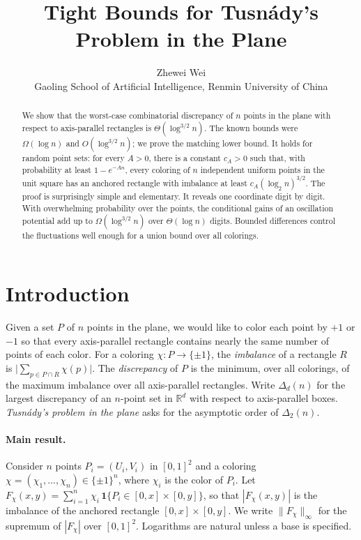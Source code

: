 \documentclass[11pt,letterpaper]{article}
\title{Tight Bounds for Tusn\'ady's Problem in the Plane}
\author{Zhewei Wei\\[2pt]
\normalsize Gaoling School of Artificial Intelligence, Renmin University of China}
\date{}
\newcommand{\R}{\mathbb{R}}
\newcommand{\1}{\mathbf{1}}
\newcommand{\Fnorm}[1]{\lVert #1\rVert_\infty}
\newcommand{\pmone}{\{\pm1\}}
\begin{document}
\hypersetup{pageanchor=false}
\maketitle

\begin{abstract}
We show that the worst-case combinatorial discrepancy of $n$ points in the plane with respect to axis-parallel rectangles is $\Theta(\log^{3/2}n)$. The known bounds were $\Omega(\log n)$ and $O(\log^{3/2}n)$; we prove the matching lower bound. It holds for random point sets: for every $A>0$, there is a constant $c_A>0$ such that, with probability at least $1-e^{-An}$, every coloring of $n$ independent uniform points in the unit square has an anchored rectangle with imbalance at least $c_A(\log_2n)^{3/2}$. The proof is surprisingly simple and elementary. It reveals one coordinate digit by digit. With overwhelming probability over the points, the conditional gains of an oscillation potential add up to $\Omega(\log^{3/2}n)$ over $\Theta(\log n)$ digits. Bounded differences control the fluctuations well enough for a union bound over all colorings.
\end{abstract}
\thispagestyle{empty}
\newpage
\setcounter{page}{1}
\hypersetup{pageanchor=true}

\section{Introduction}\label{sec:intro}

Given a set $P$ of $n$ points in the plane, we would like to color each point by $+1$ or $-1$ so that every axis-parallel rectangle contains nearly the same number of points of each color. For a coloring $\chi:P\to\pmone$, the \emph{imbalance} of a rectangle $R$ is $\bigl|\sum_{p\in P\cap R}\chi(p)\bigr|$. The \emph{discrepancy} of $P$ is the minimum, over all colorings, of the maximum imbalance over all axis-parallel rectangles. Write $\Delta_d(n)$ for the largest discrepancy of an $n$-point set in $\R^d$ with respect to axis-parallel boxes. \emph{Tusn\'ady's problem in the plane} asks for the asymptotic order of $\Delta_2(n)$.

\paragraph{Main result.}
Consider $n$ points $P_i=(U_i,V_i)$ in $[0,1]^2$ and a coloring $\chi=(\chi_1,\dots,\chi_n)\in\pmone^n$, where $\chi_i$ is the color of $P_i$. Let $F_\chi(x,y)=\sum_{i=1}^n\chi_i\,\1\{P_i\in[0,x]\times[0,y]\}$, so that $|F_\chi(x,y)|$ is the imbalance of the anchored rectangle $[0,x]\times[0,y]$. We write $\Fnorm{F_\chi}$ for the supremum of $|F_\chi|$ over $[0,1]^2$. Logarithms are natural unless a base is specified.
\end{document}
